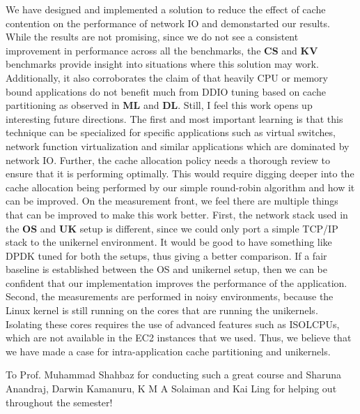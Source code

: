 \documentclass[sigconf,authorversion,noacm]{acmart}
\begin{document}
We have designed and implemented a solution to reduce the effect of cache
contention on the performance of network IO and demonstarted our results. While
the results are not promising, since we do not see a consistent improvement in
performance across all the benchmarks, the \textbf{CS} and \textbf{KV}
benchmarks provide insight into situations where this solution may work.
Additionally, it also corroborates the claim of \cite{alireza_2020} that heavily
CPU or memory bound applications do not benefit much from DDIO tuning based on
cache partitioning as observed in \textbf{ML} and \textbf{DL}. Still, I feel
this work opens up interesting future directions. The first and most important
learning is that this technique can be specialized for specific applications
such as virtual switches, network function virtualization and similar
applications which are dominated by network IO. Further, the cache allocation
policy needs a thorough review to ensure that it is performing optimally. This
would require digging deeper into the cache allocation being performed by our
simple round-robin algorithm and how it can be improved. On the measurement
front, we feel there are multiple things that can be improved to make this work
better. First, the network stack used in the \textbf{OS} and \textbf{UK} setup
is different, since we could only port a simple TCP/IP stack to the unikernel
environment. It would be good to have something like DPDK tuned for both the
setups, thus giving a better comparison. If a fair baseline is established
between the OS and unikernel setup, then we can be confident that our
implementation improves the performance of the application. Second, the
measurements are performed in noisy environments, because the Linux kernel is
still running on the cores that are running the unikernels. Isolating these
cores requires the use of advanced features such as ISOLCPUs, which are not
available in the EC2 instances that we used. Thus, we believe that we have made
a case for intra-application cache partitioning and unikernels.

\begin{acks}
    To Prof. Muhammad Shahbaz for conducting such a great course and Sharuna
    Anandraj, Darwin Kamanuru, K M A Solaiman and Kai Ling for helping out
    throughout the semester!
\end{acks}



\end{document}
